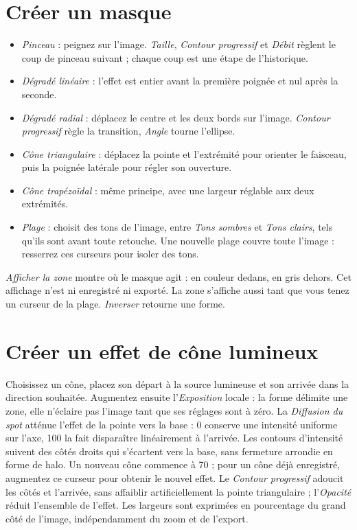 \section{Créer un masque}
\begin{itemize}
\item \emph{Pinceau} : peignez sur l’image. \emph{Taille}, \emph{Contour progressif} et
\emph{Débit} règlent le coup de pinceau suivant ; chaque coup est une étape de l’historique.
\item \emph{Dégradé linéaire} : l’effet est entier avant la première poignée et nul après la seconde.
\item \emph{Dégradé radial} : déplacez le centre et les deux bords sur l’image. \emph{Contour
progressif} règle la transition, \emph{Angle} tourne l’ellipse.
\item \emph{Cône triangulaire} : déplacez la pointe et l’extrémité pour orienter le faisceau,
puis la poignée latérale pour régler son ouverture.
\item \emph{Cône trapézoïdal} : même principe, avec une largeur réglable aux deux extrémités.
\item \emph{Plage} : choisit des tons de l’image, entre \emph{Tons sombres} et \emph{Tons clairs},
tels qu’ils sont avant toute retouche. Une nouvelle plage couvre toute l’image : resserrez ces
curseurs pour isoler des tons.
\end{itemize}
\emph{Afficher la zone} montre où le masque agit : en couleur dedans, en gris dehors. Cet affichage
n’est ni enregistré ni exporté. La zone s’affiche aussi tant que vous tenez un curseur de la plage.
\emph{Inverser} retourne une forme.

\section{Créer un effet de cône lumineux}
Choisissez un cône, placez son départ à la source lumineuse et son arrivée dans la direction
souhaitée. Augmentez ensuite l’\emph{Exposition} locale : la forme délimite une zone, elle
n’éclaire pas l’image tant que ses réglages sont à zéro. La \emph{Diffusion du spot} atténue
l’effet de la pointe vers la base : 0 conserve une intensité uniforme sur l’axe, 100 la fait
disparaître linéairement à l’arrivée. Les contours d’intensité suivent des côtés droits qui
s’écartent vers la base, sans fermeture arrondie en forme de halo. Un nouveau cône commence à 70 ; pour un cône déjà
enregistré, augmentez ce curseur pour obtenir le nouvel effet. Le \emph{Contour progressif}
adoucit les côtés et l’arrivée, sans affaiblir artificiellement la pointe triangulaire ;
l’\emph{Opacité} réduit l’ensemble de l’effet. Les largeurs sont
exprimées en pourcentage du grand côté de l’image, indépendamment du zoom et de l’export.


